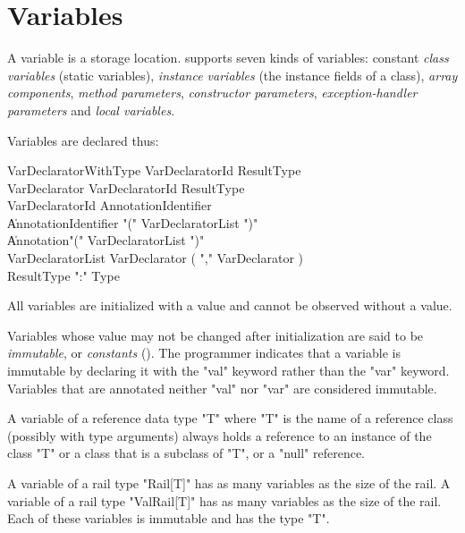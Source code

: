 \chapter{Variables}\label{XtenVariables}

A variable is a storage location.  \Xten{} supports seven kinds of
variables: constant {\em class variables} (static variables), {\em
  instance variables} (the instance fields of a class), {\em array
  components}, {\em method parameters}, {\em constructor parameters},
{\em exception-handler parameters} and {\em local variables}.

Variables are declared thus:

\begin{grammar}
VarDeclaratorWithType \: VarDeclaratorId ResultType \\
VarDeclarator \: VarDeclaratorId ResultType\opt \\
VarDeclaratorId \: Annotation\star Identifier \\
              \| Annotation\star Identifier \xcd"(" VarDeclaratorList \xcd")" \\
              \| Annotation\star \xcd"(" VarDeclaratorList \xcd")" \\
VarDeclaratorList \: VarDeclarator ( \xcd"," VarDeclarator )\star \\
ResultType \: \xcd":" Type \\
\end{grammar}

\label{exploded-syntax}
\label{VariableDeclarations}

All variables are initialized with a value and cannot be observed without
a value. 

Variables whose value may not be changed after initialization
are said to be  {\em immutable}, or {\em constants} ().
The programmer indicates that a variable is immutable by declaring
it with the \xcd"val" keyword rather than the \xcd"var" keyword.
Variables that are annotated neither \xcd"val" nor \xcd"var"
are considered immutable.

A variable of a reference data type \xcd"T" where \xcd"T" is the name
of a reference class (possibly with type arguments) always holds a
reference to an instance of the class \xcd"T" or a class that is a
subclass of \xcd"T", or a \xcd"null" reference.



A variable of a rail type \xcd"Rail[T]" has
as many variables as the size of the rail.
A variable of a rail type \xcd"ValRail[T]" has
as many variables as the size of the rail.
Each of these variables is immutable and has the type \xcd"T".

